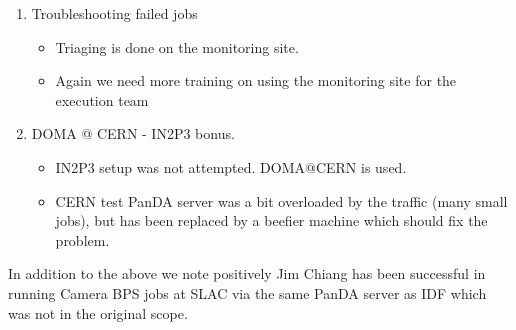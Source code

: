 \begin{enumerate}
\begin{itemize}
\end{itemize}
\item Troubleshooting failed jobs
\begin{itemize}
\item Triaging is done on the monitoring site.
\item Again we need more training on using the monitoring site for the execution team
\end{itemize}
\item  DOMA @ CERN  - IN2P3 bonus.
\begin{itemize}
\item IN2P3 setup was not attempted.  DOMA@CERN is used.
\item CERN test PanDA server was a bit overloaded by the traffic (many small jobs), but has been replaced by a beefier machine which should fix the problem.
\end{itemize}
\end{enumerate}

In addition to the above we note positively Jim Chiang has been successful in running Camera BPS jobs at SLAC via the same PanDA server as IDF
which was not in the original scope.


